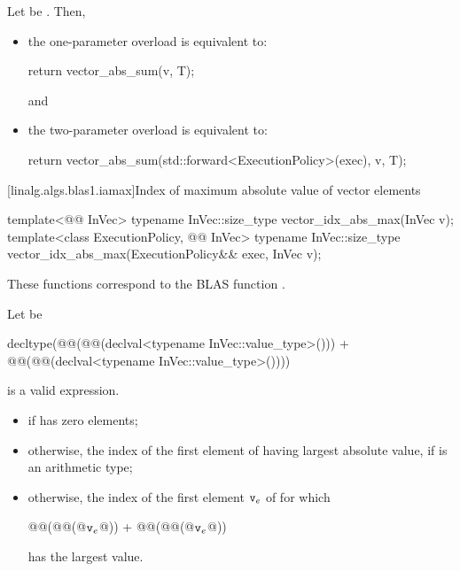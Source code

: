 \begin{itemdescr}
\pnum
\effects
Let  be .
Then,
\begin{itemize}
\item
the one-parameter overload is equivalent to:
\begin{codeblock}
return vector_abs_sum(v, T{});
\end{codeblock}
and
\item
the two-parameter overload is equivalent to:
\begin{codeblock}
return vector_abs_sum(std::forward<ExecutionPolicy>(exec), v, T{});
\end{codeblock}
\end{itemize}
\end{itemdescr}

[linalg.algs.blas1.iamax]{Index of maximum absolute value of vector elements}

%
\begin{itemdecl}
template<@@ InVec>
  typename InVec::size_type vector_idx_abs_max(InVec v);
template<class ExecutionPolicy, @@ InVec>
  typename InVec::size_type vector_idx_abs_max(ExecutionPolicy&& exec, InVec v);
\end{itemdecl}

\begin{itemdescr}
\pnum
\begin{note}
These functions correspond to the BLAS function \supercite{blas1}.
\end{note}

\pnum
Let  be
\begin{codeblock}
decltype(@@(@@(declval<typename InVec::value_type>())) +
         @@(@@(declval<typename InVec::value_type>())))
\end{codeblock}

\pnum
\mandates
{} is a valid expression.

\pnum
\returns
\begin{itemize}
\item
{}
      if  has zero elements;
\item
otherwise, the index of the first element of 
having largest absolute value,
if  is an arithmetic type;
\item
otherwise, the index of the first element $\tcode{v}_e$ of 
for which
\begin{codeblock}
@@(@@(@$\tcode{v}_e$@)) + @@(@@(@$\tcode{v}_e$@))
\end{codeblock}
has the largest value.
\end{itemize}
\end{itemdescr}

